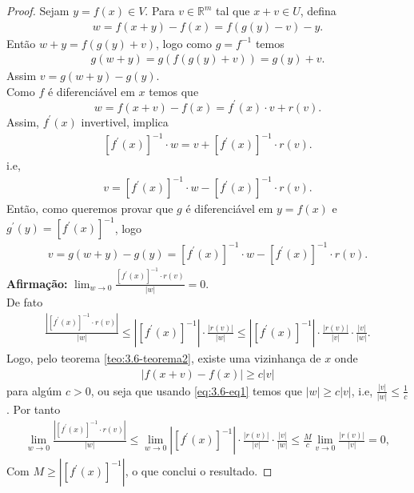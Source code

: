 \begin{proof} 
  Sejam $y=f(x)\in V$. Para $v\in\mathbb{R}^{m}$ tal que $x+v\in U$, defina
  \begin{align*}
    w=f(x+y)-f(x)=f(g(y)-v)-y.
  \end{align*}
  Então $w+y=f(g(y)+v)$, logo como $g=f^{-1}$ temos 
  \begin{align*}
    g(w+y)=g(f(g(y)+v))=g(y)+v.
  \end{align*}
  Assim $v=g(w+y)-g(y)$.\\
  Como $f$ é diferenciável em $x$ temos que
  \begin{equation}\label{eq:3.6-eq1}
    w=f(x+v)-f(x)=f^{\prime}(x)\cdot v+r(v).
  \end{equation}
  Assim, $f^{\prime}(x)$ invertivel, implica
  \begin{align*}
    \left[ f^{\prime}(x) \right]^{-1}\cdot w=v+\left[ f^{\prime}(x) \right]^{-1}\cdot r(v).
  \end{align*}
  i.e,
  \begin{align*}
    v=\left[ f^{\prime}(x) \right]^{-1}\cdot w-\left[ f^{\prime}(x) \right]^{-1}\cdot r(v).
  \end{align*}
  Então, como queremos provar que $g$ é diferenciável em $y=f(x)$ e $g^{\prime}(y)=\left[ f^{\prime}(x) \right]^{-1}$, logo
  \begin{align*}
    v=g(w+y)-g(y)=\left[ f^{\prime}(x) \right]^{-1}\cdot w-\left[ f^{\prime}(x) \right]^{-1}\cdot r(v).
  \end{align*}
  \textbf{Afirmação:} $\lim_{w \to 0}\frac{\left[ f^{\prime}(x) \right]^{-1}\cdot r(v)}{|w|}=0$.\\
  De fato
  \begin{align*}
    \frac{\left|\left[ f^{\prime}(x) \right]^{-1}\cdot r(v)\right|}{|w|}\leq \left| \left[ f^{\prime}(x)\right]^{-1} \right|\cdot \frac{|r(v)|}{|w|}\leq \left| \left[ f^{\prime}(x) \right]^{-1} \right|\cdot \frac{|r(v)|}{|v|}\cdot \frac{|v|}{|w|}.
  \end{align*}
  Logo, pelo teorema \ref{teo:3.6-teorema2}, existe uma vizinhança de $x$ onde
  \begin{align*}
    |f(x+v)-f(x)|\geq c|v|
  \end{align*}
  para algúm $c>0$, ou seja que usando \eqref{eq:3.6-eq1} temos que $|w|\geq c|v|$, i.e, $\frac{|v|}{|w|}\leq \frac{1}{c}$. Por tanto
  \begin{align*}
    \lim_{w \to 0}\frac{\left| \left[ f^{\prime}(x) \right]^{-1}\cdot r(v) \right|}{|w|}\leq \lim_{w \to 0}\left| \left[ f^{\prime}(x) \right]^{-1} \right|\cdot \frac{|r(v)|}{|v|}\cdot \frac{|v|}{|w|}\leq \frac{M}{c}\lim_{v \to 0}\frac{|r(v)|}{|v|}=0,
  \end{align*}
  Com $M\geq \left|\left[ f^{\prime}(x) \right]^{-1} \right|$, o que conclui o resultado. 
\end{proof}
